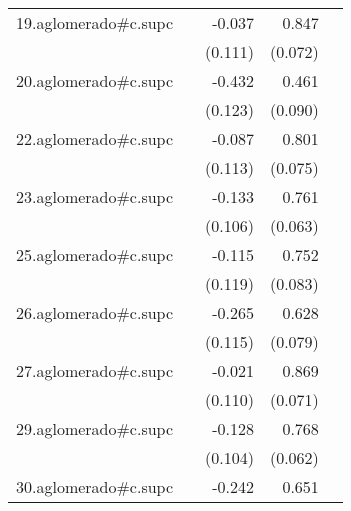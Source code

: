 {\begin{longtable}{l*{4}{D{.}{.}{-1}}}
\addlinespace
19.aglomerado#c.supc&                     &      -0.037         &       0.847\sym{***}&                     \\
            &                     &     (0.111)         &     (0.072)         &                     \\
\addlinespace
20.aglomerado#c.supc&                     &      -0.432\sym{***}&       0.461\sym{***}&                     \\
            &                     &     (0.123)         &     (0.090)         &                     \\
\addlinespace
22.aglomerado#c.supc&                     &      -0.087         &       0.801\sym{***}&                     \\
            &                     &     (0.113)         &     (0.075)         &                     \\
\addlinespace
23.aglomerado#c.supc&                     &      -0.133         &       0.761\sym{***}&                     \\
            &                     &     (0.106)         &     (0.063)         &                     \\
\addlinespace
25.aglomerado#c.supc&                     &      -0.115         &       0.752\sym{***}&                     \\
            &                     &     (0.119)         &     (0.083)         &                     \\
\addlinespace
26.aglomerado#c.supc&                     &      -0.265\sym{*}  &       0.628\sym{***}&                     \\
            &                     &     (0.115)         &     (0.079)         &                     \\
\addlinespace
27.aglomerado#c.supc&                     &      -0.021         &       0.869\sym{***}&                     \\
            &                     &     (0.110)         &     (0.071)         &                     \\
\addlinespace
29.aglomerado#c.supc&                     &      -0.128         &       0.768\sym{***}&                     \\
            &                     &     (0.104)         &     (0.062)         &                     \\
\addlinespace
30.aglomerado#c.supc&                     &      -0.242\sym{*}  &       0.651\sym{***}&                     \\

\end{longtable}}
